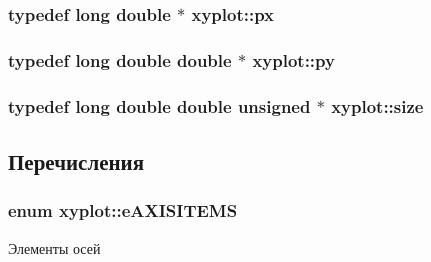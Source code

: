 \hypertarget{namespacexyplot_aa88522a2f4371e38891cac7b5bc3e4aa}{
\subsubsection[{px}]{\setlength{\rightskip}{0pt plus 5cm}typedef {\bf long} double $\ast$ {\bf xyplot\-::px}}}\label{namespacexyplot_aa88522a2f4371e38891cac7b5bc3e4aa}
\hypertarget{namespacexyplot_adc56454d6bac520db8907c6a206d3040}{
\subsubsection[{py}]{\setlength{\rightskip}{0pt plus 5cm}typedef {\bf long} double double $\ast$ {\bf xyplot\-::py}}}\label{namespacexyplot_adc56454d6bac520db8907c6a206d3040}
\hypertarget{namespacexyplot_a0e8516aaf446c174c28a4327a27dd9ce}{
\subsubsection[{size}]{\setlength{\rightskip}{0pt plus 5cm}typedef {\bf long} double double unsigned $\ast$ {\bf xyplot\-::size}}}\label{namespacexyplot_a0e8516aaf446c174c28a4327a27dd9ce}


\subsection{Перечисления}
\hypertarget{namespacexyplot_a2b769365060977648c145323dbb15e60}{
\subsubsection[{e\-A\-X\-I\-S\-I\-T\-E\-M\-S}]{\setlength{\rightskip}{0pt plus 5cm}enum {\bf xyplot\-::e\-A\-X\-I\-S\-I\-T\-E\-M\-S}}}\label{namespacexyplot_a2b769365060977648c145323dbb15e60}


Элементы осей 

